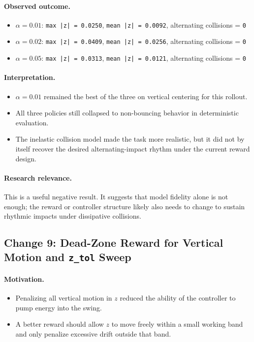 \documentclass[11pt]{article}
\begin{document}
\paragraph{Observed outcome.}
\begin{itemize}[leftmargin=1.5em]
  \item $\alpha = 0.01$: \texttt{max |z| = 0.0250}, \texttt{mean |z| = 0.0092}, alternating collisions = \texttt{0}
  \item $\alpha = 0.02$: \texttt{max |z| = 0.0409}, \texttt{mean |z| = 0.0256}, alternating collisions = \texttt{0}
  \item $\alpha = 0.05$: \texttt{max |z| = 0.0313}, \texttt{mean |z| = 0.0121}, alternating collisions = \texttt{0}
\end{itemize}

\paragraph{Interpretation.}
\begin{itemize}[leftmargin=1.5em]
  \item $\alpha = 0.01$ remained the best of the three on vertical centering for this rollout.
  \item All three policies still collapsed to non-bouncing behavior in deterministic evaluation.
  \item The inelastic collision model made the task more realistic, but it did not by itself recover the desired alternating-impact rhythm under the current reward design.
\end{itemize}

\paragraph{Research relevance.}
This is a useful negative result. It suggests that model fidelity alone is not enough; the reward or controller structure likely also needs to change to sustain rhythmic impacts under dissipative collisions.

\subsection*{Change 9: Dead-Zone Reward for Vertical Motion and \texttt{z\_tol} Sweep}

\paragraph{Motivation.}
\begin{itemize}[leftmargin=1.5em]
  \item Penalizing all vertical motion in $z$ reduced the ability of the controller to pump energy into the swing.
  \item A better reward should allow $z$ to move freely within a small working band and only penalize excessive drift outside that band.
\end{itemize}
\end{document}
